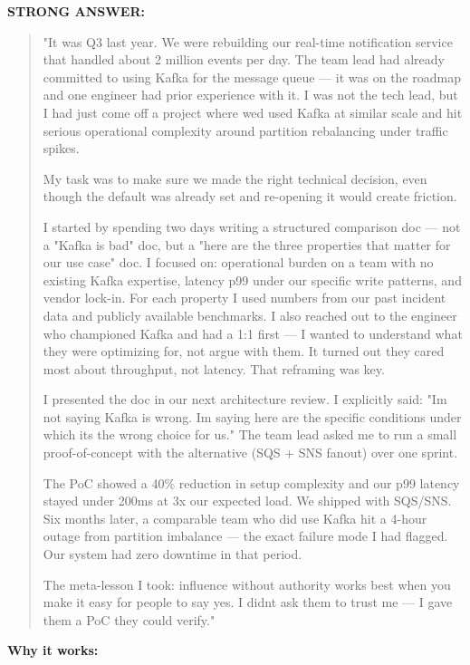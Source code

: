 \documentclass[11pt]{article}
\begin{document}
\textbf{STRONG ANSWER:}

\begin{quote}
"It was Q3 last year. We were rebuilding our real-time notification service that handled about 2 million events per day. The team lead had already committed to using Kafka for the message queue --- it was on the roadmap and one engineer had prior experience with it. I was not the tech lead, but I had just come off a project where we\textquotesingle d used Kafka at similar scale and hit serious operational complexity around partition rebalancing under traffic spikes.

My task was to make sure we made the right technical decision, even though the default was already set and re-opening it would create friction.

I started by spending two days writing a structured comparison doc --- not a "Kafka is bad" doc, but a "here are the three properties that matter for our use case" doc. I focused on: operational burden on a team with no existing Kafka expertise, latency p99 under our specific write patterns, and vendor lock-in. For each property I used numbers from our past incident data and publicly available benchmarks. I also reached out to the engineer who championed Kafka and had a 1:1 first --- I wanted to understand what they were optimizing for, not argue with them. It turned out they cared most about throughput, not latency. That reframing was key.

I presented the doc in our next architecture review. I explicitly said: "I\textquotesingle m not saying Kafka is wrong. I\textquotesingle m saying here are the specific conditions under which it\textquotesingle s the wrong choice for us." The team lead asked me to run a small proof-of-concept with the alternative (SQS + SNS fanout) over one sprint.

The PoC showed a 40\% reduction in setup complexity and our p99 latency stayed under 200ms at 3x our expected load. We shipped with SQS/SNS. Six months later, a comparable team who did use Kafka hit a 4-hour outage from partition imbalance --- the exact failure mode I had flagged. Our system had zero downtime in that period.

The meta-lesson I took: influence without authority works best when you make it easy for people to say yes. I didn\textquotesingle t ask them to trust me --- I gave them a PoC they could verify."
\end{quote}

\textbf{Why it works:}
\end{document}

